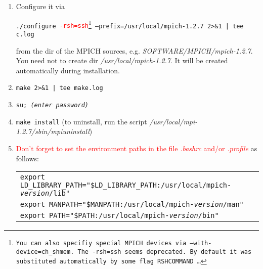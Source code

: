 \documentclass[a4paper,12pt]{article}
\newcommand{\dyeitred}{\textcolor{red}}{}
\begin{document}
\begin{enumerate}
\begin{enumerate}
\begin{enumerate}
  \item Configure it via
               \begin{center}
                   \texttt{./configure \dyeitred{-rsh=ssh}\footnote{You can
                       also specifiy special \textsc{MPICH} devices via
                       \texttt{--with-device=ch\_shmem}. The \texttt{-rsh=ssh}
                     seems deprecated. By default it was substituted
                     automatically by some flag \texttt{RSHCOMMAND \ldots} } --prefix=/usr/local/mpich-1.2.7 2>\&1 | tee c.log}
               \end{center}
         from the dir of the \textsc{MPICH} sources,
         e.g. \textit{SOFTWARE/MPICH/mpich-1.2.7}. You need not to create dir \textit{/usr/local/mpich-1.2.7}. It will be
         created automatically during installation.
             \item \texttt{make 2>\&1 | tee make.log}
         \item \texttt{su; \textit{(enter password)}}
          \item \texttt{make install} 
            (to uninstall, run the script \textit{/usr/local/mpi-1.2.7/sbin/mpiuninstall})
   \item \dyeitred {\Stopsign Don't forget to set the environment paths in the file
     \textit{.bashrc} and/or \textit{.profile}} as follows:
     \begin{center}
      \begin{tabular}{l}
       \texttt{export
         LD\_LIBRARY\_PATH="\$LD\_LIBRARY\_PATH:/usr/local/mpich-\textit{version}/lib"}\\
        \texttt{export MANPATH="\$MANPATH:/usr/local/mpich-\textit{version}/man"}\\
        \texttt{export PATH="\$PATH:/usr/local/mpich-\textit{version}/bin"}
     \end{tabular}
     \end{center}


\end{enumerate}
 


\end{enumerate}
\end{enumerate}
\end{document}

